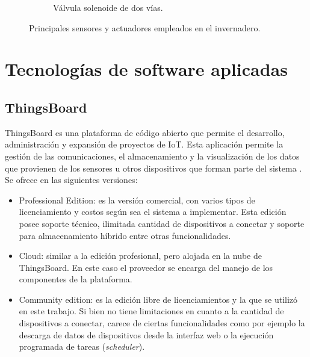 \begin{figure}[!htpb]
\begin{subfigure}[b]{0.3\textwidth}
         \caption{Válvula solenoide de dos vías.}
         \label{fig:valve}
     \end{subfigure}
        \caption[Principales sensores y actuadores empleados en el invernadero]{Principales sensores y actuadores empleados en el invernadero.}
        \label{fig:sensores}
\end{figure}




\section{Tecnologías de software aplicadas}
\label{sec:Software aplicado}
\subsection{ThingsBoard}
\label{sec:ThingsBoard}
ThingsBoard es una plataforma de código abierto que permite el desarrollo, administración y expansión de proyectos de IoT. Esta aplicación permite la gestión de las comunicaciones, el almacenamiento y la visualización de los datos que provienen de los sensores u otros dispositivos que forman parte del sistema \citep{thingsboard:1}.
Se ofrece en las siguientes versiones:
\begin{itemize}

\item Professional Edition: es la versión comercial, con varios tipos de licenciamiento y costos según sea el sistema a implementar. Esta edición posee soporte técnico, ilimitada cantidad de dispositivos a conectar y soporte para almacenamiento híbrido entre otras funcionalidades.

\item Cloud: similar a la edición profesional, pero alojada en la nube de ThingsBoard. En este caso el proveedor se encarga del manejo de los componentes de la plataforma.
 
\item Community edition: es la edición libre de licenciamientos y la que se utilizó en este trabajo. Si bien no tiene limitaciones en cuanto a la cantidad de dispositivos a conectar, carece de ciertas funcionalidades como por ejemplo la descarga de datos de dispositivos desde la interfaz web o la ejecución programada de tareas (\textit{scheduler}).
\end{itemize}
%
%
